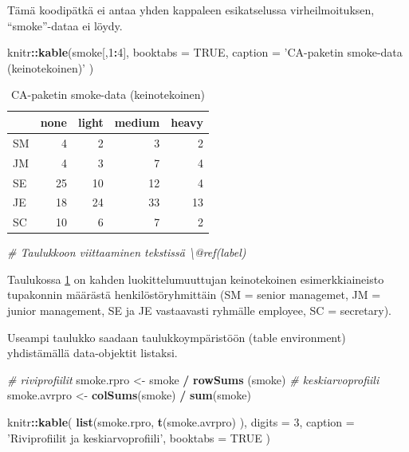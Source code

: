 \documentclass[finnish,]{book}
\newenvironment{Shaded}{\begin{snugshade}}{\end{snugshade}}
\newcommand{\CommentTok}[1]{\textcolor[rgb]{0.56,0.35,0.01}{\textit{#1}}}
\newcommand{\DataTypeTok}[1]{\textcolor[rgb]{0.13,0.29,0.53}{#1}}
\newcommand{\DecValTok}[1]{\textcolor[rgb]{0.00,0.00,0.81}{#1}}
\newcommand{\KeywordTok}[1]{\textcolor[rgb]{0.13,0.29,0.53}{\textbf{#1}}}
\newcommand{\NormalTok}[1]{#1}
\newcommand{\OperatorTok}[1]{\textcolor[rgb]{0.81,0.36,0.00}{\textbf{#1}}}
\newcommand{\OtherTok}[1]{\textcolor[rgb]{0.56,0.35,0.01}{#1}}
\newcommand{\StringTok}[1]{\textcolor[rgb]{0.31,0.60,0.02}{#1}}
\begin{document}
Tämä koodipätkä ei antaa yhden kappaleen esikatselussa virheilmoituksen, ``smoke''-dataa ei löydy.

\begin{Shaded}
\begin{Highlighting}[]
\NormalTok{knitr}\OperatorTok{::}\KeywordTok{kable}\NormalTok{(smoke[,}\DecValTok{1}\OperatorTok{:}\DecValTok{4}\NormalTok{], }\DataTypeTok{booktabs =} \OtherTok{TRUE}\NormalTok{,}
  \DataTypeTok{caption =} \StringTok{'CA-paketin smoke-data (keinotekoinen)'}
\NormalTok{)}
\end{Highlighting}
\end{Shaded}

\begin{table}[t]

\caption{\label{tab:smoketable1}CA-paketin smoke-data (keinotekoinen)}
\centering
\begin{tabular}{lrrrr}
\toprule
  & none & light & medium & heavy\\
\midrule
SM & 4 & 2 & 3 & 2\\
JM & 4 & 3 & 7 & 4\\
SE & 25 & 10 & 12 & 4\\
JE & 18 & 24 & 33 & 13\\
SC & 10 & 6 & 7 & 2\\
\bottomrule
\end{tabular}
\end{table}

\begin{Shaded}
\begin{Highlighting}[]
\CommentTok{# Taulukkoon viittaaminen tekstissä \textbackslash{}@ref(label)}
\end{Highlighting}
\end{Shaded}

Taulukossa \ref{tab:smoketable1} on kahden luokittelumuuttujan keinotekoinen esimerkkiaineisto tupakonnin määrästä henkilöstöryhmittäin (SM = senior managemet, JM = junior management, SE ja JE vastaavasti ryhmälle employee, SC = secretary).

Useampi taulukko saadaan taulukkoympäristöön (table environment) yhdistämällä data-objektit listaksi.

\begin{Shaded}
\begin{Highlighting}[]
\CommentTok{# riviprofiilit}
\NormalTok{smoke.rpro <-}\StringTok{ }\NormalTok{smoke }\OperatorTok{/}\StringTok{ }\KeywordTok{rowSums}\NormalTok{ (smoke)}
\CommentTok{# keskiarvoprofiili}
\NormalTok{smoke.avrpro <-}\StringTok{ }\KeywordTok{colSums}\NormalTok{(smoke) }\OperatorTok{/}\StringTok{ }\KeywordTok{sum}\NormalTok{(smoke)}

\NormalTok{knitr}\OperatorTok{::}\KeywordTok{kable}\NormalTok{(}
  \KeywordTok{list}\NormalTok{(smoke.rpro, }\KeywordTok{t}\NormalTok{(smoke.avrpro)   ), }\DataTypeTok{digits =} \DecValTok{3}\NormalTok{,}
  \DataTypeTok{caption =} \StringTok{'Riviprofiilit ja keskiarvoprofiili'}\NormalTok{, }\DataTypeTok{booktabs =} \OtherTok{TRUE}
\NormalTok{)}
\end{Highlighting}
\end{Shaded}
\end{document}
